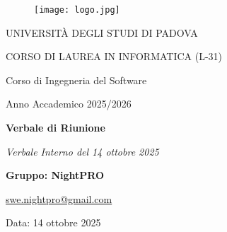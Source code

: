 \documentclass[a4paper, 11pt, oneside]{scrartcl} %
\begin{document}
\thispagestyle{empty}
\begin{titlepage}
    \centering
    
\begin{figure}
    \centering
    \texttt{[image: logo.jpg]}
\end{figure}

    \vfill
    
    {\small UNIVERSITÀ DEGLI STUDI DI PADOVA \par}
    {\small CORSO DI LAUREA IN INFORMATICA (L-31) \par}
    \vspace{0.5cm}
    {\large Corso di Ingegneria del Software \par}
    {\small Anno Accademico 2025/2026 \par}


    
    \vfill
    
    {\Huge \bfseries Verbale di Riunione \par}
    
    \vspace{1cm}
    
    {\Large \itshape Verbale Interno del 14 ottobre 2025 \par} 
    
    \vfill
    
    {\Large \bfseries Gruppo: NightPRO \par}
    \vspace{0.5cm}
    {\large \href{mailto:swe.nightpro@gmail.com}{swe.nightpro@gmail.com} \par}
    
    \vfill
    
    {\large Data: 14 ottobre 2025 \par}

\end{titlepage}

\newpage
\tableofcontents %
\pagestyle{fancy} %

\newpage
\end{document}
